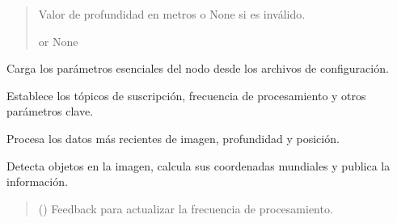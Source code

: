 \documentclass[a4paper,10pt,spanish]{sphinxmanual}
\begin{document}
\begin{fulllineitems}
\begin{fulllineitems}
\begin{quote}
\begin{description}
\sphinxAtStartPar
Valor de profundidad en metros o None si es inválido.

\sphinxAtStartPar
{} or None

\end{description}\end{quote}

\end{fulllineitems}


\begin{fulllineitems}
\label{\detokenize{squad_object_detection_action:squad_object_detection_action.TurtleBotObjectDetectionAction.load_parameters}}
\pysigstartsignatures
{}
\pysigstopsignatures
\sphinxAtStartPar
Carga los parámetros esenciales del nodo desde los archivos de configuración.

\sphinxAtStartPar
Establece los tópicos de suscripción, frecuencia de procesamiento y otros parámetros clave.

\end{fulllineitems}


\begin{fulllineitems}
\label{\detokenize{squad_object_detection_action:squad_object_detection_action.TurtleBotObjectDetectionAction.process_latest_data}}
\pysigstartsignatures
{}
\pysigstopsignatures
\sphinxAtStartPar
Procesa los datos más recientes de imagen, profundidad y posición.

\sphinxAtStartPar
Detecta objetos en la imagen, calcula sus coordenadas mundiales y publica la información.
\begin{quote}\begin{description}
\sphinxAtStartPar
{} () \textendash{} Feedback para actualizar la frecuencia de procesamiento.


\end{description}
\end{quote}
\end{fulllineitems}
\end{fulllineitems}
\end{document}

